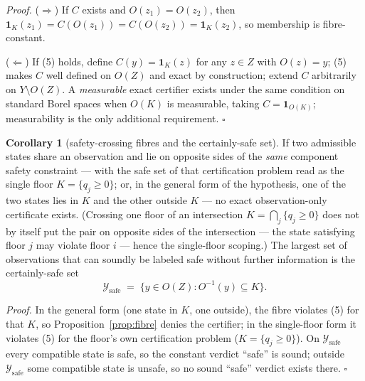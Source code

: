 \documentclass[11pt]{article}
\theoremstyle{definition}
\newtheorem{corollary}{Corollary}
\begin{document}
\emph{Proof.} (\(\Rightarrow\)) If \(C\) exists and \(O(z_1) = O(z_2)\),
then \(\mathbf{1}_K(z_1) = C(O(z_1)) = C(O(z_2)) = \mathbf{1}_K(z_2)\),
so membership is fibre-constant.

(\(\Leftarrow\)) If (5) holds, define \(C(y) = \mathbf{1}_K(z)\) for any
\(z \in Z\) with \(O(z) = y\); (5) makes \(C\) well defined on \(O(Z)\)
and exact by construction; extend \(C\) arbitrarily on
\(Y \setminus O(Z)\). A \emph{measurable} exact certifier exists under
the same condition on standard Borel spaces when \(O(K)\) is measurable,
taking \(C = \mathbf{1}_{O(K)}\); measurability is the only additional requirement. \ensuremath{\square}

\begin{corollary}[safety-crossing fibres and the certainly-safe set]\label{cor:certainly-safe} If two admissible states share an observation and lie on opposite
sides of the \emph{same} component safety constraint --- with the safe
set of that certification problem read as the single floor
\(K = \{ q_j \ge 0 \}\); or, in the general form of the hypothesis, one
of the two states lies in \(K\) and the other outside \(K\) --- no exact
observation-only certificate exists. (Crossing one floor of an
intersection \(K = \bigcap_j \{ q_j \ge 0 \}\) does not by itself put
the pair on opposite sides of the intersection --- the state satisfying
floor \(j\) may violate floor \(i\) --- hence the single-floor scoping.)
The largest set of observations that can soundly be labeled safe without
further information is the certainly-safe set
\[\mathcal{Y}_{\mathrm{safe}} \;=\; \big\{ y \in O(Z) : O^{-1}(y) \subseteq K \big\}.\]

\end{corollary}

\emph{Proof.} In the general form (one state in \(K\), one outside), the
fibre violates (5) for that \(K\), so Proposition~\ref{prop:fibre} denies the certifier; in
the single-floor form it violates (5) for the floor's own certification
problem (\(K = \{q_j \ge 0\}\)). On \(\mathcal{Y}_{\mathrm{safe}}\)
every compatible state is safe, so the constant verdict ``safe'' is
sound; outside \(\mathcal{Y}_{\mathrm{safe}}\) some compatible state is
unsafe, so no sound ``safe'' verdict exists there. \ensuremath{\square}
\end{document}
